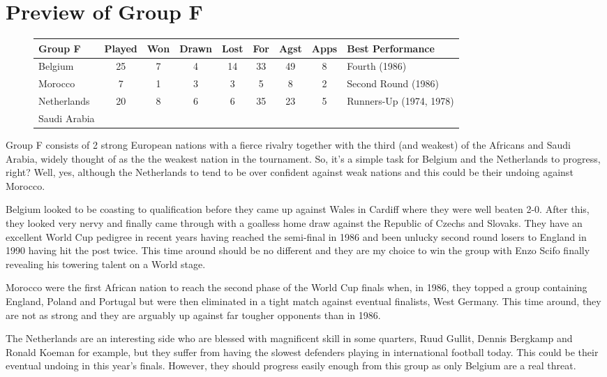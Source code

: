 \chapter{Preview of Group F}
\newline
\newline
\begin{figure}[H]
\small
\begin{tabular}{l c c c c c c c l}
Group F & Played & Won & Drawn & Lost & For & Agst & Apps & Best Performance\\ \hline
Belgium & 25 & 7 & 4 & 14 & 33 & 49 & 8 & Fourth (1986) \\
Morocco & 7 & 1 & 3 & 3 & 5 & 8 & 2 & Second Round (1986) \\
Netherlands & 20 & 8 & 6 & 6 & 35 & 23 & 5 & Runners-Up (1974, 1978) \\
Saudi Arabia & & & & & & & & \\ \hline    
\end{tabular}
\normalsize
\end{figure}
Group F consists of 2 strong European nations with a fierce rivalry together
with the third (and weakest) of the Africans and Saudi Arabia, widely thought
of as the the weakest nation in the tournament. So, it's a simple task for
Belgium and the Netherlands to progress, right? Well, yes, although the 
Netherlands to tend to be over confident against weak nations and this could
be their undoing against Morocco.

Belgium looked to be coasting to qualification before they came up against 
Wales in Cardiff where they were well beaten 2-0. After this, they looked very
nervy and finally came through with a goalless home draw against the Republic 
of Czechs and Slovaks. They have an excellent World Cup pedigree in recent 
years having reached the semi-final in 1986 and been unlucky second round 
losers to England in 1990 having hit the post twice. This time around should
be no different and they are my choice to win the group with Enzo Scifo finally
revealing his towering talent on a World stage.

Morocco were the first African nation to reach the second phase of the World 
Cup finals when, in 1986, they topped a group containing England, Poland and 
Portugal but were then eliminated in a tight match against eventual finalists,
West Germany. This time around, they are not as strong and they are arguably up
against far tougher opponents than in 1986.

The Netherlands are an interesting side who are blessed with magnificent skill
in some quarters, Ruud Gullit, Dennis Bergkamp and Ronald Koeman for example, 
but they suffer from having the slowest defenders playing in international
football today. This could be their eventual undoing in this year's finals.
However, they should progress easily enough from this group as only Belgium
are a real threat.

